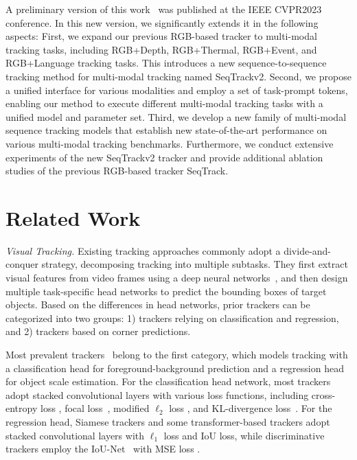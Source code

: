 A preliminary version of this work~\cite{seqtrack} was published at the IEEE CVPR2023 conference. In this new version, we significantly extends it in the following aspects: First, we expand our previous RGB-based tracker to multi-modal tracking tasks, including RGB+Depth, RGB+Thermal, RGB+Event, and RGB+Language tracking tasks. This introduces a new sequence-to-sequence tracking method for multi-modal tracking named SeqTrackv2. Second, we propose a unified interface for various modalities and employ a set of task-prompt tokens, enabling our method to execute different multi-modal tracking tasks with a unified model and parameter set. Third, we develop a new family of multi-modal sequence tracking models that establish new state-of-the-art performance on various multi-modal tracking benchmarks. Furthermore, we conduct extensive experiments of the new SeqTrackv2 tracker and provide additional ablation studies of the previous RGB-based tracker SeqTrack.

\section{Related Work}
\textit{Visual Tracking.}
Existing tracking approaches commonly adopt a divide-and-conquer strategy, decomposing tracking into multiple subtasks. They first extract visual features from video frames using a deep neural networks~\cite{ResNet, 2017Attention, ViT}, and then design multiple task-specific head networks to predict the bounding boxes of target objects.
Based on the differences in head networks, prior trackers can be categorized into two groups: 1) trackers relying on classification and regression, and 2) trackers based on corner predictions.

Most prevalent trackers~\cite{SiameseRPN,transt,SiamFC++,ostrack,ATOM, DiMP} belong to the first category, which models tracking with a classification head for foreground-background prediction and a regression head for object scale estimation. 
For the classification head network, most trackers adopt stacked convolutional layers with various loss functions, including cross-entropy loss
\cite{SiameseRPN,transt},
focal loss~\cite{SiamFC++,ostrack}, modified $\ell_2$ loss
\cite{ATOM, DiMP}, and KL-divergence loss~\cite{PrDiMP}.
For the regression head, Siamese trackers and some transformer-based trackers adopt stacked convolutional layers with $\ell_1$ loss \cite{SiameseRPN,SiamRPNplusplus} and IoU loss\cite{transt, sbt}, while discriminative trackers\cite{ATOM, DiMP} employ the IoU-Net~\cite{IOU-Net} with MSE loss \cite{ATOM}.

